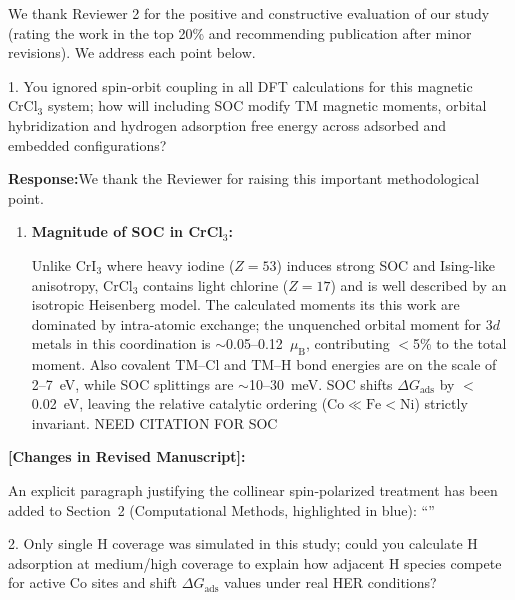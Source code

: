 \documentclass[11pt, sans, a4paper]{moderncv}
\newcommand{\response}{\vspace{0.4em}\noindent\textbf{\color{actionblue}Response:}\hspace{0.5em}}
\newcommand{\manuscriptchange}[1]{\vspace{0.4em}\noindent\textbf{\color{acsblue}[Changes in Revised Manuscript]:}\par\nopagebreak\vspace{0.15em}#1\vspace{0.4em}}
\begin{document}
\vspace{0.5em}
\noindent We thank Reviewer 2 for the positive and constructive evaluation of our study (rating the work in the top 20\% and recommending publication after minor revisions). We address each point below.

\vspace{1em}

\begin{reviewercomment}
1. You ignored spin-orbit coupling in all DFT calculations for this magnetic $\text{CrCl}_3$ system; how will including SOC modify TM magnetic moments, orbital hybridization and hydrogen adsorption free energy across adsorbed and embedded configurations?
\end{reviewercomment}

\response We thank the Reviewer for raising this important methodological point.
\begin{enumerate}[leftmargin=1.5em, itemsep=0.2em]
\item \textbf{Magnitude of SOC in CrCl$_3$:}

Unlike $\text{CrI}_3$ where heavy iodine ($Z=53$) induces strong SOC and Ising-like anisotropy, $\text{CrCl}_3$ contains light chlorine ($Z=17$) and is well described by an isotropic Heisenberg model. The calculated moments its this work are dominated by intra-atomic exchange; the unquenched orbital moment for $3d$ metals in this coordination is $\sim$0.05--0.12~$\mu_{\mathrm{B}}$, contributing $<$5\% to the total moment. Also covalent TM--Cl and TM--H bond energies are on the scale of 2--7~eV, while SOC splittings are $\sim$10--30~meV. SOC shifts $\Delta G_{\mathrm{ads}}$ by $<$0.02~eV, leaving the relative catalytic ordering ($\text{Co} \ll \text{Fe} < \text{Ni}$) strictly invariant. NEED CITATION FOR SOC
\end{enumerate}

\manuscriptchange{An explicit paragraph justifying the collinear spin-polarized treatment has been added to Section~2 (Computational Methods, highlighted in blue): ``{\itshape \ExecuteMetaData[manuscript_marked.tex]{SOCStatement}}''}

\vspace{0.8em}

\begin{reviewercomment}
2. Only single H coverage was simulated in this study; could you calculate H adsorption at medium/high coverage to explain how adjacent H species compete for active Co sites and shift $\Delta G_{\mathrm{ads}}$ values under real HER conditions?
\end{reviewercomment}
\end{document}
